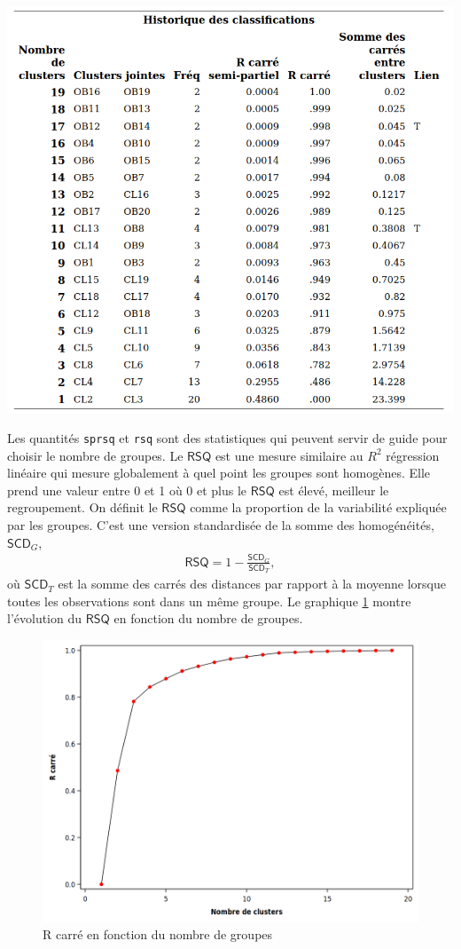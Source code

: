 \documentclass[
  11pt,
  letterpaper,
]{book}
\theoremstyle{definition}
\theoremstyle{definition}
\theoremstyle{definition}
\theoremstyle{definition}
\theoremstyle{remark}
\begin{document}
\begin{center}\includegraphics[width=0.8\linewidth]{figures/04-clustering-e3} \end{center}

Les quantités \texttt{sprsq} et \texttt{rsq} sont des statistiques qui peuvent servir de guide pour choisir le nombre de groupes. Le \(\mathsf{RSQ}\) est une mesure similaire au \(R^2\) régression linéaire qui mesure globalement à quel point les groupes sont homogènes. Elle prend une valeur entre 0 et 1 où 0 et plus le \(\mathsf{RSQ}\) est élevé, meilleur le regroupement.
On définit le \(\mathsf{RSQ}\) comme la proportion de la variabilité expliquée par les groupes. C'est une version standardisée de la somme des homogénéités, \(\mathsf{SCD}_G\),
\begin{align*}
\mathsf{RSQ} = 1-\frac{\mathsf{SCD}_G}{\mathsf{SCD}_T},
\end{align*}
où \(\mathsf{SCD}_T\) est la somme des carrés des distances par rapport à la moyenne lorsque toutes les observations sont dans un même groupe. Le graphique \ref{fig:fig4-e4} montre l'évolution du \(\mathsf{RSQ}\) en fonction du nombre de groupes.

\begin{figure}

{\centering \includegraphics[width=0.8\linewidth]{figures/04-clustering-e4} 

}

\caption{R carré en fonction du nombre de groupes}\label{fig:fig4-e4}
\end{figure}
\end{document}
